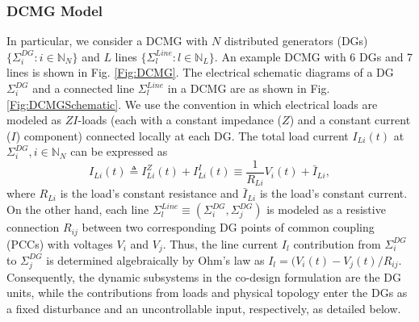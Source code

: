 \documentclass[letterpaper, 10 pt, conference]{ieeeconf}%
\newcommand{\N}{\mathbb{N}}
\newcommand{\0}{\mathbf{0}}
\begin{document}
\subsubsection{\textbf{DCMG Model}} In particular, we consider a DCMG with $N$ distributed generators (DGs) $\{\Sigma_i^{DG}:i\in\N_N\}$ and $L$ lines $\{\Sigma_l^{Line}:l\in\N_L\}$. An example DCMG with 6 DGs and 7 lines is shown in Fig. \ref{Fig:DCMG}. The electrical schematic diagrams of a DG $\Sigma_i^{DG}$ and a connected line $\Sigma_l^{Line}$ in a DCMG are as shown in Fig. \ref{Fig:DCMGSchematic}. We use the convention in which electrical loads are modeled as $ZI$-loads (each with a constant impedance ($Z$) and a constant current ($I$) component) connected locally at each DG. The total load current $I_{Li}(t)$ at $\Sigma_i^{DG}, i\in\N_N$ can be expressed as 
$$
I_{Li}(t) \triangleq I_{Li}^{Z}(t) + I_{Li}^{I}(t) \equiv \frac{1}{R_{Li}}V_i(t) + \bar{I}_{Li},
$$
where $R_{Li}$ is the load's constant resistance and $\bar{I}_{Li}$ is the load's constant current. 
On the other hand, each line $\Sigma_l^{Line}\equiv(\Sigma_i^{DG},\Sigma_j^{DG})$ is modeled as a resistive connection $R_{ij}$ between two corresponding DG points of common coupling (PCCs) with voltages $V_i$ and $V_j$. Thus, the line current $I_l$ contribution from $\Sigma_i^{DG}$ to $\Sigma_j^{DG}$ is determined algebraically by Ohm's law as $I_l=(V_i(t)-V_j(t)/R_{ij}$. Consequently, the dynamic subsystems in the co-design formulation are the DG units, while the contributions from loads and physical topology enter the DGs as a fixed disturbance and an uncontrollable input, respectively, as detailed below.
\end{document}
